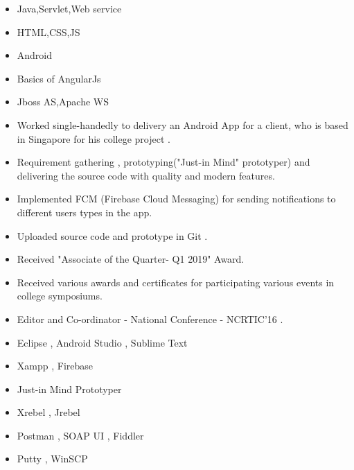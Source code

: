 
\begin{itemize}
\item{Java,Servlet,Web service}%
\item{HTML,CSS,JS}%
\item{Android}%
\item{Basics of AngularJs}%
\item {Jboss AS,Apache WS}
\end{itemize}


\smallskip
\smallskip
\smallskip
{}
\smallskip
\smallskip
\smallskip
{}


\smallskip
{}

\begin{itemize}
\item Worked single-handedly to delivery an Android App for a client, who is based in Singapore for his college project .
\small
\item Requirement gathering , prototyping("Just-in Mind" prototyper) and delivering the source code with quality and modern features.
\small
\item Implemented FCM (Firebase Cloud Messaging) for sending notifications to different users types in the app.
\small
\item Uploaded source code and prototype in Git .
\end{itemize}


\begin{itemize}
    \item Received "Associate of the Quarter- Q1 2019" Award.
    \item Received various awards and certificates for participating various events in college symposiums.
    \item Editor and Co-ordinator - National Conference - NCRTIC'16 .
\end{itemize}

\begin{itemize}
    \item Eclipse , Android Studio , Sublime Text
    \item Xampp , Firebase 
    \item Just-in Mind Prototyper 
    \item Xrebel , Jrebel
    \item Postman , SOAP UI , Fiddler
    \item Putty , WinSCP
    
\end{itemize}

